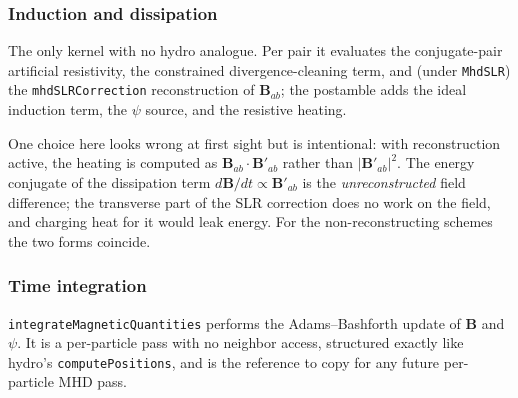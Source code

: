\subsubsection*{Induction and dissipation}
The only kernel with no hydro analogue. Per pair it evaluates the conjugate-pair artificial resistivity, the constrained divergence-cleaning term, and (under \texttt{MhdSLR}) the \texttt{mhdSLRCorrection} reconstruction of $\mathbf{B}_{ab}$; the postamble adds the ideal induction term, the $\psi$ source, and the resistive heating.

One choice here looks wrong at first sight but is intentional: with reconstruction active, the heating is computed as $\mathbf{B}_{ab} \cdot \mathbf{B}'_{ab}$ rather than $|\mathbf{B}'_{ab}|^2$. The energy conjugate of the dissipation term $d\mathbf{B}/dt \propto \mathbf{B}'_{ab}$ is the \emph{unreconstructed} field difference; the transverse part of the SLR correction does no work on the field, and charging heat for it would leak energy. For the non-reconstructing schemes the two forms coincide.

\subsubsection*{Time integration}
\texttt{integrateMagneticQuantities} performs the Adams--Bashforth update of $\mathbf{B}$ and $\psi$. It is a per-particle pass with no neighbor access, structured exactly like hydro's \texttt{computePositions}, and is the reference to copy for any future per-particle MHD pass.




